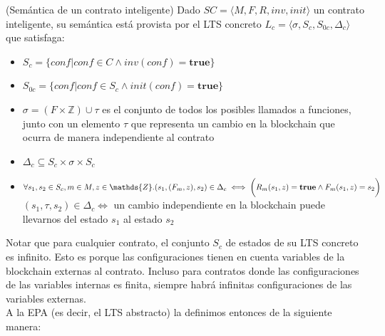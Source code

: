 \begin{definition}\label{definicion-lts}(Semántica de un contrato inteligente)
    Dado $SC = \langle M, F, R, inv, init \rangle$ un contrato inteligente, su semántica está provista por el LTS concreto $L_c = \langle \sigma , S_c, S_{0c}, \Delta _c \rangle$ que satisfaga:
    \begin{itemize}
        \item $S_c = \{conf | conf \in C \land inv(conf) = \textbf{true}\}$
        \item $S_{0c} = \{conf | conf \in S_c \land init(conf) = \textbf{true}\}$
        \item $\sigma = (F \times \mathds{Z}) \cup \tau$ es el conjunto de todos los posibles llamados a funciones, junto con un elemento $\tau$ que representa un cambio en la blockchain que ocurra de manera independiente al contrato
        \item $\Delta _c \subseteq S_c \times \sigma \times S_c$
        \item $\forall s_1,s_2 \in S_c, m \in M, z \in \mathds{Z} . \\ (s_1,(F_m,z),s_2) \in \Delta _c \iff \bigg( R_m(s_1,z) = \textbf{true} \land   F_m(s_1,z) = s_2 \bigg)$ \\
              $(s_1,\tau,s_2) \in \Delta _c \iff$ un cambio independiente en la blockchain puede llevarnos del estado $s_1$ al estado $s_2$
    \end{itemize}
\end{definition}
Notar que para cualquier contrato, el conjunto $S_c$ de estados de su LTS concreto es infinito.
Esto es porque las configuraciones tienen en cuenta variables de la blockchain externas al contrato.
Incluso para contratos donde las configuraciones de las variables internas es finita, siempre habrá infinitas configuraciones de las variables externas.
\\

A la EPA (es decir, el LTS abstracto) la definimos entonces de la siguiente manera:

